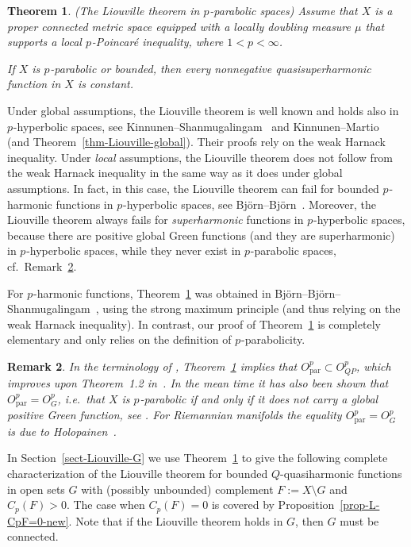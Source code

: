 \documentclass[a4paper,twoside]{article}
\theoremstyle{propositional}
\newtheorem{thm}{Theorem}[section]
\theoremstyle{descriptive}
\theoremstyle{remarkstyle}
\newtheorem{remark}[thm]{Remark}
\newcommand{\setm}{\setminus}
\newcommand{\Cp}{{C_p}}
\DeclareMathOperator{\para}{par}
%
%
%
%
{\catcode`p =12 \catcode`t =12 \gdef\eeaa#1pt{#1}}      %
\def\accentadjtext#1{\setbox0\hbox{$#1$}\kern   %
                \expandafter\eeaa\the\fontdimen1\textfont1 \ht0 }
\def\accentadjscript#1{\setbox0\hbox{$#1$}\kern %
                \expandafter\eeaa\the\fontdimen1\scriptfont1 \ht0 }
\def\accentadjscriptscript#1{\setbox0\hbox{$#1$}\kern   %
                \expandafter\eeaa\the\fontdimen1\scriptscriptfont1 \ht0 }
\def\accentadjtextback#1{\setbox0\hbox{$#1$}\kern       %
                -\expandafter\eeaa\the\fontdimen1\textfont1 \ht0 }
\def\accentadjscriptback#1{\setbox0\hbox{$#1$}\kern     %
                -\expandafter\eeaa\the\fontdimen1\scriptfont1 \ht0 }
\def\accentadjscriptscriptback#1{\setbox0\hbox{$#1$}\kern %
                -\expandafter\eeaa\the\fontdimen1\scriptscriptfont1 \ht0 }
\def\itoverline#1{{\mathsurround0pt\mathchoice
        {\rlap{$\accentadjtext{\displaystyle #1}
                \accentadjtext{\vrule height1.593pt}
                \overline{\phantom{\displaystyle #1}
                \accentadjtextback{\displaystyle #1}}$}{#1}}
        {\rlap{$\accentadjtext{\textstyle #1}
                \accentadjtext{\vrule height1.593pt}
                \overline{\phantom{\textstyle #1}
                \accentadjtextback{\textstyle #1}}$}{#1}}
        {\rlap{$\accentadjscript{\scriptstyle #1}
                \accentadjscript{\vrule height1.593pt}
                \overline{\phantom{\scriptstyle #1}
                \accentadjscriptback{\scriptstyle #1}}$}{#1}}
        {\rlap{$\accentadjscriptscript{\scriptscriptstyle #1}
                \accentadjscriptscript{\vrule height1.593pt}
                \overline{\phantom{\scriptscriptstyle #1}
                \accentadjscriptscriptback{\scriptscriptstyle #1}}$}{#1}}}}
\def\itunderline#1{{\mathsurround0pt\mathchoice
        {\rlap{$\underline{\phantom{\displaystyle #1}
                \accentadjtextback{\displaystyle #1}}$}{#1}}
        {\rlap{$\underline{\phantom{\textstyle #1}
                \accentadjtextback{\textstyle #1}}$}{#1}}
        {\rlap{$\underline{\phantom{\scriptstyle #1}
                \accentadjscriptback{\scriptstyle #1}}$}{#1}}
        {\rlap{$\underline{\phantom{\scriptscriptstyle #1}
                \accentadjscriptscriptback{\scriptscriptstyle #1}}$}{#1}}}}
\newcommand{\p}{{$p\mspace{1mu}$}}
\numberwithin{equation}{section}
\begin{document}
\begin{thm} \label{thm-Liouville-para}
\textup{(The Liouville theorem in \p-parabolic spaces)}
Assume that   $X$ is a proper connected metric space
equipped with a locally doubling measure $\mu$ that
supports a local \p-Poincar\'e inequality, where $1<p<\infty$.

If $X$ is \p-parabolic or bounded, then 
every nonnegative quasisuperharmonic function in $X$
is constant.
\end{thm}

Under global assumptions, the Liouville theorem
is well known and holds
also in \p-hyperbolic spaces, see 
Kinnunen--Shan\-mu\-ga\-lin\-gam~\cite{KiSh01} and
Kinnunen--Martio~\cite{KiMa03}
(and Theorem~\ref{thm-Liouville-global}).
Their proofs rely on the weak Harnack inequality.
Under \emph{local} assumptions, the Liouville theorem
does not follow from the weak Harnack inequality in the same way as it 
does under global assumptions.
In fact,  in this case, the Liouville theorem can fail 
for bounded \p-harmonic functions in \p-hyperbolic spaces,  
see Bj\"orn--Bj\"orn~\cite[Example~10.3]{BBsemilocal}.
Moreover, the Liouville theorem always fails for \emph{superharmonic} functions
in \p-hyperbolic spaces, because there 
are positive global Green functions 
(and they are superharmonic) in \p-hyperbolic spaces, 
while they never exist in \p-parabolic spaces, cf.\ Remark~\ref{rmk-hypend}.


For \p-harmonic functions, Theorem~\ref{thm-Liouville-para}
was obtained in 
Bj\"orn--Bj\"orn--Shan\-mu\-ga\-lin\-gam~\cite[Proposition~6.7]{BBShypend},
using the strong maximum principle (and thus relying 
on the weak Harnack inequality).
In contrast, our proof of Theorem~\ref{thm-Liouville-para}
is completely elementary and only relies on the
definition of \p-parabolicity.

\begin{remark} \label{rmk-hypend}
In the terminology of \cite{BBShypend},
Theorem~\ref{thm-Liouville-para} implies that 
$O^p_{\para}  \subset    O^p_{QP}$,
which improves upon Theorem~1.2 in~\cite{BBShypend}.
In the mean time it has also been
shown that $O^p_{\para}= O^p_{G}$, i.e.\ that $X$ is
\p-parabolic if and only if it does not carry a global positive Green function, see
\cite[Theorem~1.1]{BBglobal}.
For Riemannian manifolds the equality $O^p_{\para}= O^p_{G}$ 
is due to Holopainen~\cite[Theorem~3.27]{Ho}.
\end{remark}

In Section~\ref{sect-Liouville-G} we  use Theorem~\ref{thm-Liouville-para}
to give the following complete characterization of the Liouville theorem
for bounded  $Q$-quasiharmonic
functions in open sets $G$ with (possibly unbounded)
complement $F:=X \setm G$  
and $\Cp(F)>0$.
The case when $\Cp(F)=0$ is covered by Proposition~\ref{prop-L-CpF=0-new}.
Note that
if  the Liouville theorem holds in $G$, then $G$ must be connected.
\end{document}

